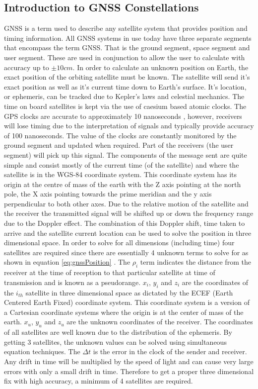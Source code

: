 \subsection{Introduction to GNSS Constellations}\label{subsec:GNSS_Intro}
GNSS is a term used to describe any satellite system that provides position and timing information. All GNSS systems in use today have three separate segments that
encompass the term GNSS. That is the ground segment, space segment and user segment. These are used in conjunction to allow the user to calculate with accuracy up to $\pm
10cm$. In order to calculate an unknown position on Earth, the exact position of the orbiting satellite must be known. The satellite will send it's exact position as well
as it's current time down to Earth's surface. It's location, or ephemeris, can be tracked due to Kepler's laws and celestial mechanics. The time on board satellites is
kept via the use of caesium based atomic clocks. The GPS clocks are accurate to approximately 10 nanoseconds , however, receivers will lose timing due to
the interpretation of signals and typically provide accuracy of 100 nanoseconds. The value of the clocks are constantly monitored by the ground segment and updated when
required. Part of the receivers (the user segment) will pick up this signal. The components of the message sent are quite simple and consist mostly of the current time
(of the satellite) and where the satellite is in the WGS-84 coordinate system\cite{RN46}. This coordinate system has its origin at the centre of mass of the earth with
the Z axis pointing at the north pole, the X axis pointing towards the prime meridian and the y axis perpendicular to both other axes. Due to the relative motion of the
satellite and the receiver the transmitted signal will be shifted up or down the frequency range due to the Doppler effect. The combination of this Doppler shift, time
taken to arrive and the satellite current location can be used to solve the position in three dimensional space. In order to solve for all dimensions (including time)
four satellites are required since there are essentially 4 unknown terms to solve for as shown in equation \ref{eq:gnssPosition} \cite{RN46}. The $\rho_i$ term indicates
the distance from the receiver at the time of reception to that particular satellite at time of transmission  and is known as a pseudorange. $x_i$, $y_i$ and $z_i$ are
the coordinates of the $i_{th}$ satellite in three dimensional space as dictated by the ECEF (Earth Centered Earth Fixed) coordinate system. This coordinate system is a
version of a Cartesian coordinate systems where the origin is at the center of mass of the earth. $x_u$, $y_u$ and $z_u$ are the unknown coordinates of the receiver. The
coordinates of all satellites are well known due to the distribution of the ephemeris. By getting 3 satellites, the unknown values can be solved using simultaneous
equation techniques. The $\Delta t$ is the error in the clock of the sender and receiver. Any drift in time will be multiplied by the speed of light and can cause very
large errors with only a small drift in time. Therefore to get a proper three dimensional fix with high accuracy, a minimum of 4 satellites are required.  

